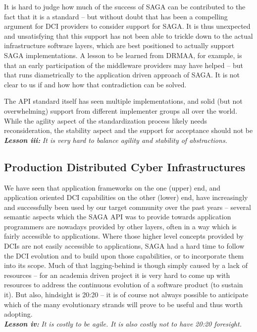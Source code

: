 \documentclass[]{article}
\newcommand{\I}[1]{\textit{#1}}
\newcommand{\BI}[1]{\textbf{\textit{#1}}}
\begin{document}
  It is hard to judge how much of the success of SAGA can be
  contributed to the fact that it is a standard -- but without doubt
  that has been a compelling argument for DCI providers to consider
  support for SAGA.  It is thus unexpected and unsatisfying that this
  support has not been able to trickle down to the actual
  infrastructure software layers, which are best positioned to
  actually support SAGA implementations.  A lesson to be learned from
  DRMAA, for example, is that an early participation of the middleware
  providers may have helped -- but that runs diametrically to the
  application driven approach of SAGA.  It is not clear to us if and
  how how that contradiction can be solved.

  The API standard itself has seen multiple implementations, and solid
  (but not overwhelming) support from different implementer groups all
  over the world.  While the agility aspect of the standardization
  process likely needs reconsideration, the stability aspect and the
  support for acceptance should not be\\
  \BI{Lesson iii:} \I{It is very hard to balance agility and stability
  of abstractions.}


\subsection{Production Distributed Cyber Infrastructures}

  We have seen that application frameworks on the one (upper) end, and
  application oriented DCI capabilities on the other (lower) end, have
  increasingly and successfully been used by our target community over
  the past years -- several semantic aspects which the SAGA API was to
  provide towards application programmers are nowadays provided by
  other layers, often in a way which is fairly accessible to
  applications.  Where those higher level concepts provided by DCIs
  are not easily accessible to applications, SAGA had a hard time to
  follow the DCI evolution and to build upon those capabilities, or to
  incorporate them into its scope.  Much of that lagging-behind is
  though simply caused by a lack of resources -- for an academia
  driven project it is very hard to come up with resources to address
  the continuous evolution of a software product (to sustain it).  But
  also, hindsight is 20:20 -- it is of course not always possible to
  anticipate which of the many evolutionary strands will prove to be
  useful and thus worth adopting.\\
  \BI{Lesson iv:} \I{It is costly to be agile. It is also costly not to 
  have 20:20 foresight.}
\end{document}
